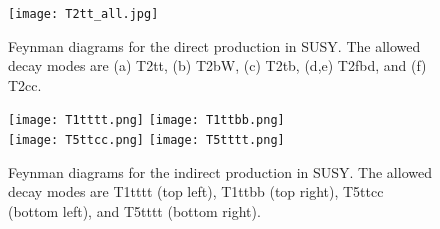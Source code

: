 \begin{figure}[!h]
	\begin{center}
		\texttt{[image: T2tt\_all.jpg]}
	\end{center}
	\caption[Direct stop production]{Feynman diagrams for the direct \st{} production in SUSY. The allowed decay modes are (a) T2tt, (b) T2bW, (c) T2tb, (d,e) T2fbd, and (f) T2cc. }
	\label{fig:stop-direct-production}
\end{figure}

\begin{figure}[!h]
	\begin{center}
		\texttt{[image: T1tttt.png]}
		\texttt{[image: T1ttbb.png]} \\
		\texttt{[image: T5ttcc.png]}
		\texttt{[image: T5tttt.png]} \\
	\end{center}
	\caption[Gluino mediated stop production]{Feynman diagrams for the indirect \st{} production in SUSY. The allowed decay modes are T1tttt (top left), T1ttbb (top right), T5ttcc (bottom left), and T5tttt (bottom right).
	}
	\label{fig:stop-gluino-production}
\end{figure}
